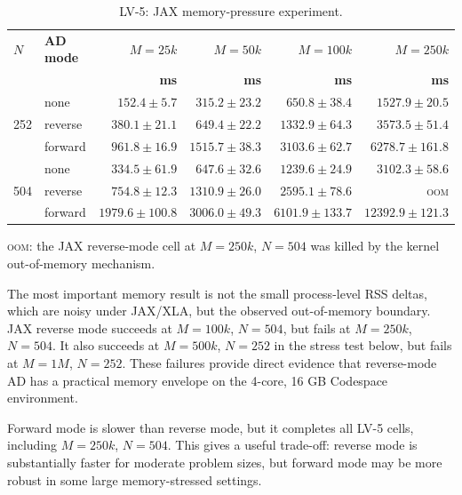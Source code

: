 \begin{table}[htbp]
\centering
\small
\begin{threeparttable}
\caption{LV-5: JAX memory-pressure experiment.}
\label{tab:lv5-memory}
\begin{tabular}{llrrrr}
\toprule
\textbf{\(N\)} & \textbf{AD mode}
& \textbf{\(M=25k\)}
& \textbf{\(M=50k\)}
& \textbf{\(M=100k\)}
& \textbf{\(M=250k\)} \\
& & \textbf{ms} & \textbf{ms} & \textbf{ms} & \textbf{ms} \\
\midrule
\multirow{3}{*}{252}
& none
& \(152.4\pm 5.7\)
& \(315.2\pm23.2\)
& \(650.8\pm38.4\)
& \(1527.9\pm20.5\) \\
& reverse
& \(380.1\pm21.1\)
& \(649.4\pm22.2\)
& \(1332.9\pm64.3\)
& \(3573.5\pm51.4\) \\
& forward
& \(961.8\pm16.9\)
& \(1515.7\pm38.3\)
& \(3103.6\pm62.7\)
& \(6278.7\pm161.8\) \\
\midrule
\multirow{3}{*}{504}
& none
& \(334.5\pm61.9\)
& \(647.6\pm32.6\)
& \(1239.6\pm24.9\)
& \(3102.3\pm58.6\) \\
& reverse
& \(754.8\pm12.3\)
& \(1310.9\pm26.0\)
& \(2595.1\pm78.6\)
& \textsc{oom} \\
& forward
& \(1979.6\pm100.8\)
& \(3006.0\pm49.3\)
& \(6101.9\pm133.7\)
& \(12392.9\pm121.3\) \\
\bottomrule
\end{tabular}
\begin{tablenotes}
\footnotesize
\item \textsc{oom}: the JAX reverse-mode cell at \(M=250k\), \(N=504\)
was killed by the kernel out-of-memory mechanism.
\end{tablenotes}
\end{threeparttable}
\end{table}

The most important memory result is not the small process-level RSS deltas,
which are noisy under JAX/XLA, but the observed out-of-memory boundary.
JAX reverse mode succeeds at \(M=100k\), \(N=504\), but fails at
\(M=250k\), \(N=504\).  It also succeeds at \(M=500k\), \(N=252\) in the
stress test below, but fails at \(M=1M\), \(N=252\).  These failures provide
direct evidence that reverse-mode AD has a practical memory envelope on the
4-core, 16 GB Codespace environment.

Forward mode is slower than reverse mode, but it completes all LV-5 cells,
including \(M=250k\), \(N=504\).  This gives a useful trade-off: reverse
mode is substantially faster for moderate problem sizes, but forward mode may
be more robust in some large memory-stressed settings.

